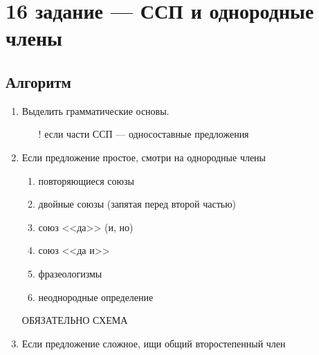 \documentclass[12pt]{article}
\begin{document}
\section{16 задание --- ССП и однородные члены}

\subsection{Алгоритм}
\begin{enumerate}
    \item Выделить грамматические основы.
          \begin{itemize}
              \item[!] если части ССП --- односоставные предложения
          \end{itemize}
    \item Если предложение простое, смотри на однородные члены
          \begin{enumerate}
              \item  повторяющиеся союзы
              \item  двойные союзы (запятая перед второй частью)
              \item  союз <<да>> (и, но)
              \item  союз <<да и>>
              \item  фразеологизмы
              \item  неоднородные определение
          \end{enumerate}
          ОБЯЗАТЕЛЬНО СХЕМА
    \item Если предложение сложное, ищи общий второстепенный член
\end{enumerate}
\end{document}
